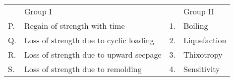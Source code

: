    \begin{tabular}{llll}
            &Group I & &Group II \\
            P. &Regain of strength with time & 1. &Boiling \\
            Q.& Loss of strength due to cyclic loading & 2. &Liquefaction \\
            R. &Loss of strength due to upward seepage & 3.& Thixotropy \\
            S. &Loss of strength due to remolding & 4. &Sensitivity \\
        \end{tabular}